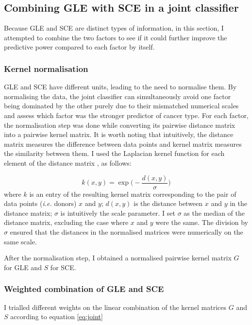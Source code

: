 \subsection{Combining GLE with SCE in a joint classifier}\label{methods:ml_both}
Because GLE and SCE are distinct types of information, in this section, I attempted to combine the two factors to see if it could further improve the predictive power compared to each factor by itself.

\subsubsection{Kernel normalisation}
GLE and SCE have different units, leading to the need to normalise them. By normalising the data, the joint classifier can simultaneously avoid one factor being dominated by the other purely due to their mismatched numerical scales and assess which factor was the stronger predictor of cancer type. For each factor, the normalisation step was done while converting its pairwise distance matrix into a pairwise kernel matrix. It is worth noting that intuitively, the distance matrix measures the difference between data points and kernel matrix measures the similarity between them. I used the Laplacian kernel function for each element of the distance matrix \citep{Wang2016ApplicationFunction}, as follows:

\begin{equation}
    k(x,y) = \exp\bigg( - \frac{d(x,y)}{\sigma}\bigg)
    \label{eq:laplacian}
\end{equation}
where $k$ is an entry of the resulting kernel matrix corresponding to the pair of data points (\textit{i.e.} donors) $x$ and $y$; $d(x,y)$ is the distance between $x$ and $y$ in the distance matrix; $\sigma$ is intuitively the scale parameter. I set $\sigma$ as the median of the distance matrix, excluding the case where $x$ and $y$ were the same. The division by $\sigma$ ensured that the distances in the normalised matrices were numerically on the same scale.

After the normalisation step, I obtained a normalised pairwise kernel matrix $G$ for GLE and $S$ for SCE.

\subsubsection{Weighted combination of GLE and SCE}
I trialled different weights on the linear combination of the kernel matrices $G$ and $S$ according to equation \ref{eq:joint}

